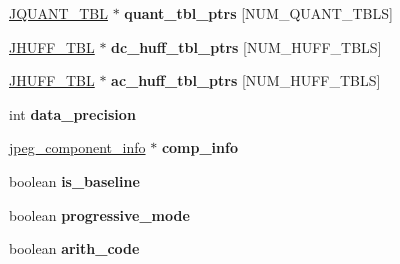 \begin{DoxyCompactItemize}
\item 
\hypertarget{structjpeg__decompress__struct_acadfce86bbd2928bd54197fa81579feb}{\hyperlink{structJQUANT__TBL}{J\-Q\-U\-A\-N\-T\-\_\-\-T\-B\-L} $\ast$ {\bfseries quant\-\_\-tbl\-\_\-ptrs} \mbox{[}N\-U\-M\-\_\-\-Q\-U\-A\-N\-T\-\_\-\-T\-B\-L\-S\mbox{]}}\label{structjpeg__decompress__struct_acadfce86bbd2928bd54197fa81579feb}

\item 
\hypertarget{structjpeg__decompress__struct_a8d4cd26e16fe92bfcfa380b8ba9d0af2}{\hyperlink{structJHUFF__TBL}{J\-H\-U\-F\-F\-\_\-\-T\-B\-L} $\ast$ {\bfseries dc\-\_\-huff\-\_\-tbl\-\_\-ptrs} \mbox{[}N\-U\-M\-\_\-\-H\-U\-F\-F\-\_\-\-T\-B\-L\-S\mbox{]}}\label{structjpeg__decompress__struct_a8d4cd26e16fe92bfcfa380b8ba9d0af2}

\item 
\hypertarget{structjpeg__decompress__struct_a25f7b5f953896fbdf03e0502c786776f}{\hyperlink{structJHUFF__TBL}{J\-H\-U\-F\-F\-\_\-\-T\-B\-L} $\ast$ {\bfseries ac\-\_\-huff\-\_\-tbl\-\_\-ptrs} \mbox{[}N\-U\-M\-\_\-\-H\-U\-F\-F\-\_\-\-T\-B\-L\-S\mbox{]}}\label{structjpeg__decompress__struct_a25f7b5f953896fbdf03e0502c786776f}

\item 
\hypertarget{structjpeg__decompress__struct_ad55d8fc56faa42d05d1a80ad84ce3e9c}{int {\bfseries data\-\_\-precision}}\label{structjpeg__decompress__struct_ad55d8fc56faa42d05d1a80ad84ce3e9c}

\item 
\hypertarget{structjpeg__decompress__struct_a2254cdaced19008dadec99526d640df6}{\hyperlink{structjpeg__component__info}{jpeg\-\_\-component\-\_\-info} $\ast$ {\bfseries comp\-\_\-info}}\label{structjpeg__decompress__struct_a2254cdaced19008dadec99526d640df6}

\item 
\hypertarget{structjpeg__decompress__struct_a7ba5fd9c43f0bd3161f1fc618aa39e37}{boolean {\bfseries is\-\_\-baseline}}\label{structjpeg__decompress__struct_a7ba5fd9c43f0bd3161f1fc618aa39e37}

\item 
\hypertarget{structjpeg__decompress__struct_a6e2f9fd1cba287dc632070f3c8390d1c}{boolean {\bfseries progressive\-\_\-mode}}\label{structjpeg__decompress__struct_a6e2f9fd1cba287dc632070f3c8390d1c}

\item 
\hypertarget{structjpeg__decompress__struct_aa59d02c7dfa58e22321c1f5fa154b151}{boolean {\bfseries arith\-\_\-code}}\label{structjpeg__decompress__struct_aa59d02c7dfa58e22321c1f5fa154b151}


\end{DoxyCompactItemize}
